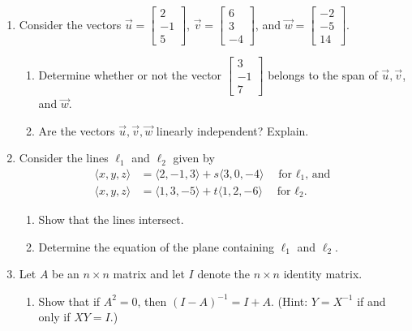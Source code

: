 \documentclass[12pt]{article}
\newcommand{\points}[1]{\marginpar{\hspace{24pt}[#1]}}
\newcommand{\bbm}{\begin{bmatrix}}
\newcommand{\ebm}{\end{bmatrix}}
\begin{document}
\begin{enumerate}
\newpage

\item Consider the vectors $\vec{u} = \bbm 2\\-1\\5\ebm$, $\vec{v} = \bbm 6\\3\\-4\ebm$, and $\vec{w} = \bbm -2\\-5\\14\ebm$.
\begin{enumerate}
 \item Determine whether or not the vector $\bbm 3\\-1\\7\ebm$ belongs to the span of $\vec{u}, \vec{v}$, and $\vec{w}$. \points{6}

\vspace{5.5in}

 \item Are the vectors $\vec{u}, \vec{v}, \vec{w}$ linearly independent? Explain. \points{3}
\end{enumerate}

\newpage

\item Consider the lines $\ell_1$ and $\ell_2$ given by
\begin{align*}
 \langle x,y,z\rangle &= \langle 2, -1, 3\rangle + s\langle 3, 0, -4\rangle \quad \text{for $\ell_1$, and}\\
 \langle x,y,z\rangle & = \langle 1, 3, -5\rangle + t\langle 1, 2, -6\rangle \quad \text{for $\ell_2$.}
\end{align*}
\begin{enumerate}
 \item Show that the lines intersect. \points{4}

\vspace{3.5in}

 \item Determine the equation of the plane containing $\ell_1$ and $\ell_2$. \points{4}
\end{enumerate}

\newpage


 \item Let $A$ be an $n\times n$ matrix and let $I$ denote the $n\times n$ identity matrix.
\begin{enumerate}
 \item Show that if $A^2=0$, then $(I-A)^{-1} = I+A$. \points{2} (Hint: $Y=X^{-1}$ if and only if $XY=I$.)

\vspace{2in}


\end{enumerate}
\end{enumerate}
\end{document}
